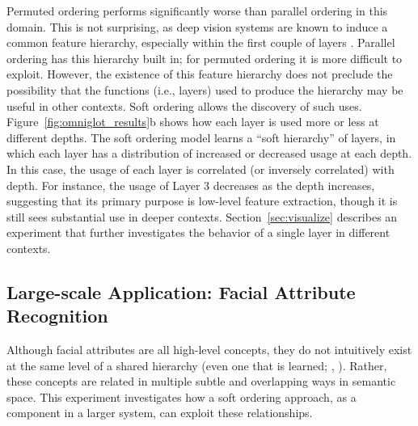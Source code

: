 \documentclass{article}
\theoremstyle{definition}
\theoremstyle{remark}
\begin{document}
Permuted ordering performs significantly worse than parallel ordering in this domain.
This is not surprising, as deep vision systems are known to induce a common feature hierarchy, especially within the first couple of layers \citep{Lee:2008, Lecun:2015}.
Parallel ordering has this hierarchy built in; for permuted ordering it is more difficult to exploit.
However, the existence of this feature hierarchy does not preclude the possibility that the functions (i.e., layers) used to produce the hierarchy may be useful in other contexts.
Soft ordering allows the discovery of such uses.
Figure~\ref{fig:omniglot_results}b shows how each layer is used more or less at different depths.
The soft ordering model learns a ``soft hierarchy'' of layers, in which each layer has a distribution of increased or decreased usage at each depth.
In this case, the usage of each layer is correlated (or inversely correlated) with depth.
For instance, the usage of Layer 3 decreases as the depth increases, suggesting that its primary purpose is low-level feature extraction, though it is still sees substantial use in deeper contexts.
Section~\ref{sec:visualize} describes an experiment that further investigates the behavior of a single layer in different contexts.

\subsection{Large-scale Application: Facial Attribute Recognition}

Although facial attributes are all high-level concepts, they do not intuitively exist at the same level of a shared hierarchy (even one that is learned; \citeauthor{Lu:2016}, \citeyear{Lu:2016}).
Rather, these concepts are related in multiple subtle and overlapping ways in semantic space.
This experiment investigates how a soft ordering approach, as a component in a larger system, can exploit these relationships.
\end{document}

